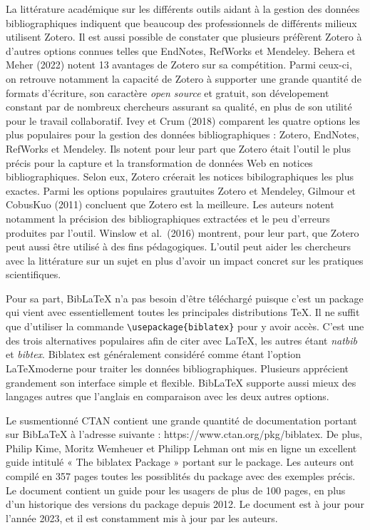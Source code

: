 \documentclass[
  letterpaper,
  DIV=11,
  numbers=noendperiod]{scrreprt}
\begin{document}
La littérature académique sur les différents outils aidant à la gestion
des données bibliographiques indiquent que beaucoup des professionnels
de différents milieux utilisent Zotero. Il est aussi possible de
constater que plusieurs préfèrent Zotero à d'autres options connues
telles que EndNotes, RefWorks et Mendeley. Behera et Meher (2022) notent
13 avantages de Zotero sur sa compétition. Parmi ceux-ci, on retrouve
notamment la capacité de Zotero à supporter une grande quantité de
formats d'écriture, son caractère \emph{open source} et gratuit, son
dévelopement constant par de nombreux chercheurs assurant sa qualité, en
plus de son utilité pour le travail collaboratif. Ivey et Crum (2018)
comparent les quatre options les plus populaires pour la gestion des
données bibliographiques : Zotero, EndNotes, RefWorks et Mendeley. Ils
notent pour leur part que Zotero était l'outil le plus précis pour la
capture et la transformation de données Web en notices bibliographiques.
Selon eux, Zotero créerait les notices bibilographiques les plus
exactes. Parmi les options populaires grautuites Zotero et Mendeley,
Gilmour et CobusKuo (2011) concluent que Zotero est la meilleure. Les
auteurs notent notamment la précision des bibliographiques extractées et
le peu d'erreurs produites par l'outil. Winslow et al.~(2016) montrent,
pour leur part, que Zotero peut aussi être utilisé à des fins
pédagogiques. L'outil peut aider les chercheurs avec la littérature sur
un sujet en plus d'avoir un impact concret sur les pratiques
scientifiques.

Pour sa part, BibLaTeX n'a pas besoin d'être téléchargé puisque c'est un
package qui vient avec essentiellement toutes les principales
distributions TeX. Il ne suffit que d'utiliser la commande
\texttt{\textbackslash{}usepackage\{biblatex\}} pour y avoir accès.
C'est une des trois alternatives populaires afin de citer avec LaTeX,
les autres étant \emph{natbib} et \emph{bibtex}. Biblatex est
généralement considéré comme étant l'option \LaTeX moderne pour traiter
les données bibliographiques. Plusieurs apprécient grandement son
interface simple et flexible. BibLaTeX supporte aussi mieux des langages
autres que l'anglais en comparaison avec les deux autres options.

Le susmentionné CTAN contient une grande quantité de documentation
portant sur BibLaTeX à l'adresse suivante :
https://www.ctan.org/pkg/biblatex. De plus, Philip Kime, Moritz Wemheuer
et Philipp Lehman ont mis en ligne un excellent guide intitulé « The
biblatex Package » portant sur le package. Les auteurs ont compilé en
357 pages toutes les possiblités du package avec des exemples précis. Le
document contient un guide pour les usagers de plus de 100 pages, en
plus d'un historique des versions du package depuis 2012. Le document
est à jour pour l'année 2023, et il est constamment mis à jour par les
auteurs.
\end{document}
